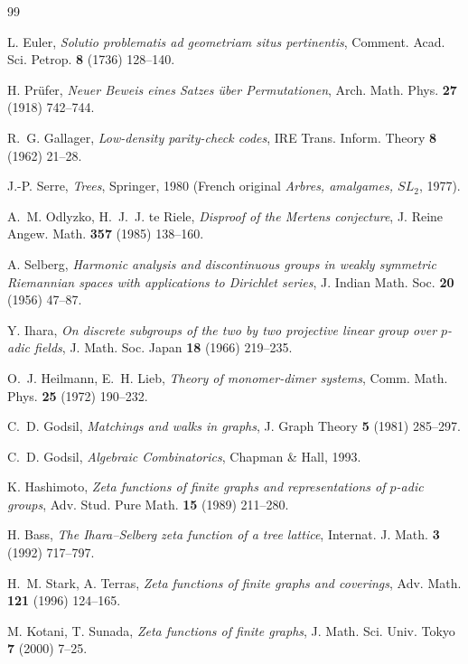 \documentclass[11pt]{article}
\begin{document}
\begin{thebibliography}{99}\small

 L. Euler,
\emph{Solutio problematis ad geometriam situs pertinentis},
Comment. Acad. Sci. Petrop. \textbf{8} (1736) 128--140.

 H. Pr\"ufer,
\emph{Neuer Beweis eines Satzes \"uber Permutationen},
Arch. Math. Phys. \textbf{27} (1918) 742--744.

 R.~G. Gallager,
\emph{Low-density parity-check codes}, IRE Trans. Inform. Theory \textbf{8} (1962) 21--28.

 J.-P. Serre,
\emph{Trees}, Springer, 1980 (French original \emph{Arbres, amalgames, $SL_2$}, 1977).

 A.~M. Odlyzko, H.~J.~J. te Riele,
\emph{Disproof of the Mertens conjecture}, J. Reine Angew. Math. \textbf{357} (1985)
138--160.

 A. Selberg,
\emph{Harmonic analysis and discontinuous groups in weakly symmetric Riemannian spaces with
applications to Dirichlet series}, J. Indian Math. Soc. \textbf{20} (1956) 47--87.

 Y. Ihara,
\emph{On discrete subgroups of the two by two projective linear group over $p$-adic fields},
J. Math. Soc. Japan \textbf{18} (1966) 219--235.

 O.~J. Heilmann, E.~H. Lieb,
\emph{Theory of monomer-dimer systems}, Comm. Math. Phys. \textbf{25} (1972) 190--232.

 C.~D. Godsil,
\emph{Matchings and walks in graphs}, J. Graph Theory \textbf{5} (1981) 285--297.

 C.~D. Godsil,
\emph{Algebraic Combinatorics}, Chapman \& Hall, 1993.

 K. Hashimoto,
\emph{Zeta functions of finite graphs and representations of $p$-adic groups},
Adv. Stud. Pure Math. \textbf{15} (1989) 211--280.

 H. Bass,
\emph{The Ihara--Selberg zeta function of a tree lattice},
Internat. J. Math. \textbf{3} (1992) 717--797.

 H.~M. Stark, A. Terras,
\emph{Zeta functions of finite graphs and coverings}, Adv. Math. \textbf{121} (1996)
124--165.

 M. Kotani, T. Sunada,
\emph{Zeta functions of finite graphs}, J. Math. Sci. Univ. Tokyo \textbf{7} (2000) 7--25.


\end{thebibliography}
\end{document}

